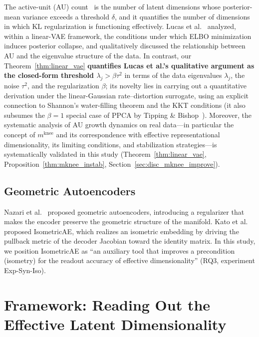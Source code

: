 \documentclass[make,article,submit,pdftex,moreauthors]{Definitions/mdpi}
\newcommand{\mknee}{m^{\mathrm{knee}}}
\begin{document}
The active-unit (AU) count~\cite{lucas2019elbo,higgins2017betavae} is the
number of latent dimensions whose posterior-mean variance exceeds a threshold
$\delta$, and it quantifies the number of dimensions in which KL regularization
is functioning effectively.
Lucas et al.~\cite{lucas2019elbo} analyzed, within a linear-VAE framework, the
conditions under which ELBO minimization induces posterior collapse, and
qualitatively discussed the relationship between AU and the eigenvalue
structure of the data.
In contrast, our Theorem~\ref{thm:linear_vae} \textbf{quantifies Lucas et al.'s
qualitative argument as the closed-form threshold $\lambda_j > \beta\tau^2$}
in terms of the data eigenvalues $\lambda_j$, the noise $\tau^2$, and the
regularization $\beta$; its novelty lies in carrying out a quantitative
derivation under the linear-Gaussian rate--distortion surrogate, using an
explicit connection to Shannon's water-filling theorem and the KKT conditions
(it also subsumes the $\beta=1$ special case of PPCA by Tipping \&
Bishop~\cite{tippingbishop1999ppca}).
Moreover, the systematic analysis of AU growth dynamics on real data---in
particular the concept of $\mknee$ and its correspondence with effective
representational dimensionality, its limiting conditions, and stabilization
strategies---is systematically validated in this study
(Theorem~\ref{thm:linear_vae}, Proposition~\ref{thm:mknee_instab},
Section~\ref{sec:disc_mknee_improve}).

\subsection{Geometric Autoencoders}\label{sec:related_geo}

Nazari et al.~\cite{nazari2023geometric} proposed geometric autoencoders,
introducing a regularizer that makes the encoder preserve the geometric
structure of the manifold.
Kato et al.~\cite{kato2020rdae} proposed IsometricAE, which realizes an
isometric embedding by driving the pullback metric of the decoder Jacobian
toward the identity matrix.
In this study, we position IsometricAE as ``an auxiliary tool that improves a
precondition (isometry) for the readout accuracy of effective dimensionality''
(RQ3, experiment Exp-Syn-Iso).

\section{Framework: Reading Out the Effective Latent Dimensionality}\label{sec:framework}
\end{document}
